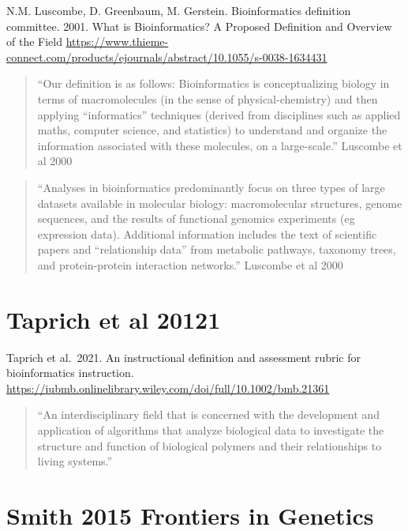 \documentclass[
]{book}
\begin{document}
N.M. Luscombe, D. Greenbaum, M. Gerstein. Bioinformatics definition committee. 2001. What is Bioinformatics? A Proposed Definition and Overview of the Field \url{https://www.thieme-connect.com/products/ejournals/abstract/10.1055/s-0038-1634431}

\begin{quote}
``Our definition is as follows: Bioinformatics is conceptualizing biology in terms of macromolecules (in the sense of physical-chemistry) and then applying ``informatics'' techniques (derived from disciplines such as applied maths, computer science, and statistics) to understand and organize the information associated with these molecules, on a large-scale.'' Luscombe et al 2000
\end{quote}

\begin{quote}
``Analyses in bioinformatics predominantly focus on three types of large datasets available in molecular biology: macromolecular structures, genome sequences, and the results of functional genomics experiments (eg expression data). Additional information includes the text of scientific papers and ``relationship data'' from metabolic pathways, taxonomy trees, and protein-protein interaction networks.'' Luscombe et al 2000
\end{quote}

\hypertarget{taprich-et-al-20121}{%
\section{Taprich et al 20121}\label{taprich-et-al-20121}}

Taprich et al.~2021. An instructional definition and assessment rubric for bioinformatics instruction. \url{https://iubmb.onlinelibrary.wiley.com/doi/full/10.1002/bmb.21361}

\begin{quote}
``An interdisciplinary field that is concerned with the development and application of algorithms that analyze biological data to investigate the structure and function of biological polymers and their relationships to living systems.''
\end{quote}

\hypertarget{smith-2015-frontiers-in-genetics}{%
\section{Smith 2015 Frontiers in Genetics}\label{smith-2015-frontiers-in-genetics}}
\end{document}
